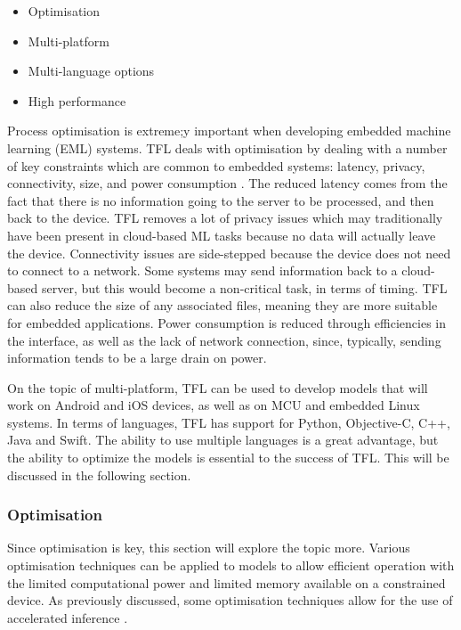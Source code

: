 \documentclass[conference]{IEEEtran}
\begin{document}
\begin{itemize}
    \item Optimisation
    \item Multi-platform
    \item Multi-language options
    \item High performance
\end{itemize}

Process optimisation is extreme;y important when developing embedded machine learning (EML) systems. TFL deals with optimisation by dealing with a number of key constraints which are common to embedded systems: latency, privacy, connectivity, size, and power consumption \cite{jetson1}. The reduced latency comes from the fact that there is no information going to the server to be processed, and then back to the device. TFL removes a lot of privacy issues which may traditionally have been present in cloud-based ML tasks because no data will actually leave the device. Connectivity issues are side-stepped because the device does not need to connect to a network. Some systems may send information back to a cloud-based server, but this would become a non-critical task, in terms of timing. TFL can also reduce the size of any associated files, meaning they are more suitable for embedded applications. Power consumption is reduced through efficiencies in the interface, as well as the lack of network connection, since, typically, sending information tends to be a large drain on power.

On the topic of multi-platform, TFL can be used to develop models that will work on Android and iOS devices, as well as on MCU and embedded Linux systems. In terms of languages, TFL has support for Python, Objective-C, C++, Java and Swift. The ability to use multiple languages is a great advantage, but the ability to optimize the models is essential to the success of TFL. This will be discussed in the following section.

\subsubsection{Optimisation} Since optimisation is key, this section will explore the topic more. Various optimisation techniques can be applied to models to allow efficient operation with the limited computational power and limited memory available on a constrained device. As previously discussed, some optimisation techniques allow for the use of accelerated inference \cite{tfl2}.
\end{document}
